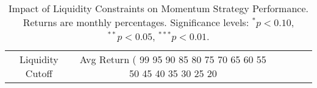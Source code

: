 \begin{table}
\caption{Impact of Liquidity Constraints on Momentum Strategy Performance. Returns are monthly percentages. Significance levels: $^{*}p<0.10$, $^{**}p<0.05$, $^{***}p<0.01$.}
\label{tab:liquidity_analysis}
\begin{tabular}{c|ccccc}
\toprule
Liquidity Cutoff & Avg Return (%
\midrule
100%
99%
95%
90%
85%
80%
75%
70%
65%
60%
55%
50%
45%
40%
35%
30%
25%
20%
\bottomrule
\end{tabular}
\end{table}
